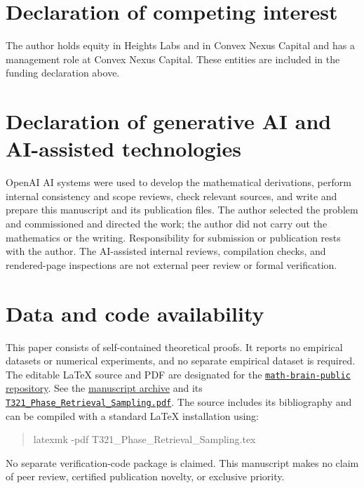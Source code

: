 \documentclass[11pt,letterpaper]{article}
\numberwithin{equation}{section}
\theoremstyle{remark}
\newcommand{\1}{\mathbf 1}
\begin{document}
\section*{Declaration of competing interest}

The author holds equity in Heights Labs and in Convex Nexus Capital and has a management role at Convex Nexus Capital. These entities are included in the funding declaration above.

\section*{Declaration of generative AI and AI-assisted technologies}

OpenAI AI systems were used to develop the mathematical derivations, perform internal consistency and scope reviews, check relevant sources, and write and prepare this manuscript and its publication files. The author selected the problem and commissioned and directed the work; the author did not carry out the mathematics or the writing. Responsibility for submission or publication rests with the author. The AI-assisted internal reviews, compilation checks, and rendered-page inspections are not external peer review or formal verification.

\section*{Data and code availability}

This paper consists of self-contained theoretical proofs. It reports no empirical datasets or numerical experiments, and no separate empirical dataset is required. The editable LaTeX source and PDF are designated for the
\href{https://github.com/yspennstate/math-brain-public}{\texttt{math-brain-public} repository}.
See the \href{https://github.com/yspennstate/math-brain-public/tree/main/papers/t321-phase-retrieval-2026-10-31}{manuscript archive} and its
\href{https://github.com/yspennstate/math-brain-public/blob/main/papers/t321-phase-retrieval-2026-10-31/T321_Phase_Retrieval_Sampling.pdf}{\texttt{T321\_Phase\_Retrieval\_Sampling.pdf}}.
The source includes its bibliography and can be compiled with a standard LaTeX installation using:
\begin{quote}\small\ttfamily
latexmk -pdf T321\_Phase\_Retrieval\_Sampling.tex
\end{quote}
No separate verification-code package is claimed. This manuscript makes no claim of peer review, certified publication novelty, or exclusive priority.
\end{document}
